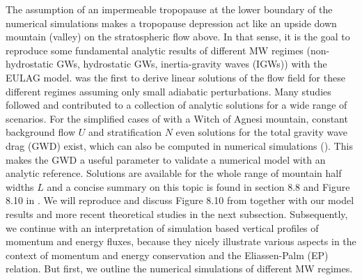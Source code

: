 The assumption of an impermeable tropopause at the lower boundary of the numerical simulations makes a tropopause depression act like an upside down mountain (valley) on the stratospheric flow above. In that sense, it is the goal to reproduce some fundamental analytic results of different MW regimes (non-hydrostatic GWs, hydrostatic GWs, inertia-gravity waves (IGWs)) with the EULAG model. \textcite{queney_problem_1948} was the first to derive linear solutions of the flow field for these different regimes assuming only small adiabatic perturbations. Many studies followed and contributed to a collection of analytic solutions for a wide range of scenarios. For the simplified cases of \textcite{queney_problem_1948} with a Witch of Agnesi mountain, constant background flow $U$ and stratification $N$ even solutions for the total gravity wave drag (GWD) exist, which can also be computed in numerical simulations (\cite[]{teixeira_physics_2014}). This makes the GWD a useful parameter to validate a numerical model with an analytic reference. Solutions are available for the whole range of mountain half widths $L$ and a concise summary on this topic is found in section 8.8 and Figure 8.10 in \textcite{gill_atmosphere-ocean_1982}. We will reproduce and discuss Figure 8.10 from \textcite[]{gill_atmosphere-ocean_1982} together with our model results and more recent theoretical studies in the next subsection. Subsequently, we continue with an interpretation of simulation based vertical profiles of momentum and energy fluxes, because they nicely illustrate various aspects in the context of momentum and energy conservation and the Eliassen-Palm (EP) relation. But first, we outline the numerical simulations of different MW regimes.

